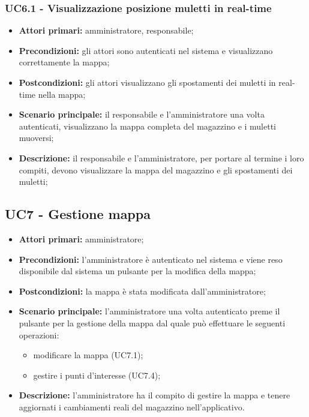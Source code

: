 \subsubsection{UC6.1 - Visualizzazione posizione muletti in real-time}
\begin{itemize}
	\item 	\textbf{Attori primari:} amministratore, responsabile;
	\item 	\textbf{Precondizioni:} gli attori sono autenticati nel sistema e visualizzano correttamente la mappa;
	\item 	\textbf{Postcondizioni:} gli attori visualizzano gli spostamenti dei muletti in real-time nella mappa;
	\item 	\textbf{Scenario principale:} il responsabile e l’amministratore una volta autenticati, visualizzano la mappa completa del magazzino e i muletti muoversi;
	\item 	\textbf{Descrizione:} il responsabile e l’amministratore, per portare al termine i loro compiti, devono visualizzare la mappa del magazzino e gli spostamenti dei muletti;
\end{itemize}

\subsection{UC7 - Gestione mappa}

\begin{itemize}
	\item 	\textbf{Attori primari:} amministratore;
	\item 	\textbf{Precondizioni:} l’amministratore è autenticato nel sistema e viene reso disponibile dal sistema un pulsante per la modifica della mappa;
	\item 	\textbf{Postcondizioni:} la mappa è stata modificata dall’amministratore;
	\item 	\textbf{Scenario principale:} l’amministratore una volta autenticato preme il pulsante per la gestione della mappa dal quale può effettuare le seguenti operazioni:
	\begin{itemize}
		\item modificare la mappa (UC7.1);
		\item gestire i punti d’interesse (UC7.4);
	\end{itemize}
	\item 	\textbf{Descrizione:} l’amministratore ha il compito di gestire la mappa e tenere aggiornati i cambiamenti reali del magazzino nell’applicativo.
\end{itemize}


